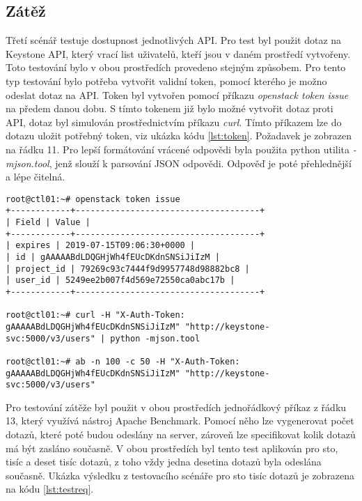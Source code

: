 \subsection{Zátěž}
Třetí scénář testuje dostupnost jednotlivých API. Pro test byl použit dotaz na Keystone API, který vrací list uživatelů, kteří jsou v daném prostředí vytvořeny. Toto testování bylo v obou prostředích provedeno stejným způsobem. Pro tento typ testování bylo potřeba vytvořit validní token, pomocí kterého je možno odeslat dotaz na API. Token byl vytvořen pomocí příkazu \textit{openstack token issue} na předem danou dobu. S tímto tokenem již bylo možné vytvořit dotaz proti API, dotaz byl simulován prostřednictvím příkazu \textit{curl}. Tímto příkazem lze do dotazu uložit potřebný token, viz ukázka kódu \ref{lst:token}. Požadavek je zobrazen na řádku 11. Pro lepší formátování vrácené odpovědi byla použita python utilita \textit{-mjson.tool}, jenž slouží k parsování JSON odpovědi. Odpověď je poté přehlednější a lépe čitelná.

\begin{lstlisting}[caption={Token issue a dotaz na Keystone API, zdroj: vlastní tvorba},label={lst:token}]
root@ctl01:~# openstack token issue
+------------+-------------------------------------+
| Field | Value |
+------------+-------------------------------------+
| expires | 2019-07-15T09:06:30+0000 |
| id | gAAAAABdLDQGHjWh4fEUcDKdnSNSiJiIzM |
| project_id | 79269c93c7444f9d9957748d98882bc8 |
| user_id | 5249ee2b007f4d569e72550ca0abc17b |
+------------+-------------------------------------+

root@ctl01:~# curl -H "X-Auth-Token: gAAAAABdLDQGHjWh4fEUcDKdnSNSiJiIzM" "http://keystone-svc:5000/v3/users" | python -mjson.tool

root@ctl01:~# ab -n 100 -c 50 -H "X-Auth-Token: gAAAAABdLDQGHjWh4fEUcDKdnSNSiJiIzM" "http://keystone-svc:5000/v3/users"

\end{lstlisting}

Pro testování zátěže byl použit v obou prostředích jednořádkový příkaz z řádku 13, který využívá nástroj Apache Benchmark. Pomocí něho lze vygenerovat počet dotazů, které poté budou odeslány na server, zároveň lze specifikovat kolik dotazů má být zasláno současně. V obou prostředích byl tento test aplikován pro sto, tisíc a deset tisíc dotazů, z toho vždy jedna desetina dotazů byla odeslána současně. Ukázka výsledku z testovacího scénáře pro sto tisíc dotazů je zobrazena na kódu \ref{lst:testreq}.

